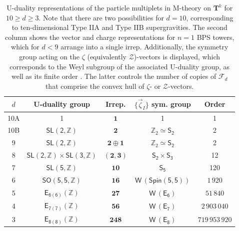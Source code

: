 \begin{table}[h!!]\begin{center}
		\renewcommand{\arraystretch}{1.00}
		\begin{tabular}{|c|c|c|c|c|}
			\hline
			$d$ &  U-duality group  & Irrep. &  $\{\vec{\zeta}_I\}$ sym. group & Order\\
			\hline 
                \hline
			10A & 1  & $\mathbf{1}$ & 1 & 1 \\
			10B & $\mathsf{SL(2,\mathbb{Z})}$  & $\mathbf{2}$ & $\mathbb{Z}_2 \simeq \mathsf{S_2}$ & 2 \\
			9 & $\mathsf{SL(2,\mathbb{Z})}$   & $\mathbf{2} \oplus \mathbf{1}$ & $\mathbb{Z}_2 \simeq \mathsf{S_2}$ & 2 \\
			8 & $\mathsf{SL(2,\mathbb{Z})} \times \mathsf{SL(3,\mathbb{Z})}$  & $(\mathbf{2},\mathbf{3} )$ & $\mathsf{S_2}\times \mathsf{S_3}$ & 12 \\
			7 & $\mathsf{SL(5,\mathbb{Z})}$  & $\mathbf{10}$ & $\mathsf{S_5}$ & 120 \\
			6 & $\mathsf{SO(5, 5, \mathbb{Z})}$  & $\mathbf{16}$ & $\mathsf{\text{W}\, (Spin(5,5))}$ & $1\,920$ \\
			5 & $\mathsf{E_{6 (6)} (\mathbb{Z})}$  & $\mathbf{27}$ & $\mathsf{\text{W}\, (E_6)}$ & $51\,840$ \\
			4 & $\mathsf{E_{7 (7)} (\mathbb{Z})}$  & $\mathbf{56}$ & $\mathsf{\text{W}\, (E_7)}$ & $2\,903\,040$ \\
			3 & $\mathsf{E_{8 (8)} (\mathbb{Z})}$  & $\mathbf{248}$ & $\mathsf{\text{W}\, (E_8)}$ & $719\,953\,920$ \\
				\hline
		\end{tabular}
		\caption{\small U-duality representations of the particle multiplets in M-theory on $\mathbf{T}^{k}$ \cite{Obers:1998fb} for $10\geq d\geq 3$. Note that there are two possibilities for $d=10$, corresponding to ten-dimensional Type IIA and Type IIB supergravities. The second column shows the vector and charge representations for $n=1$ BPS towers, which for $d<9$ arrange into a single irrep. Additionally, the symmetry group acting on the $\zeta$ (equivalently $\mathcal{Z}$)-vectors is displayed, which corresponds to the Weyl subgroup of the associated U-duality group, as well as its finite order \cite{wilson2009finite}. The latter controls the number of copies of $\mathscr{F}_d$ that comprise the convex hull of $\zeta$- or $\mathcal{Z}$-vectors.}
		\label{tab:irreps}
	\end{center}
\end{table}
	
